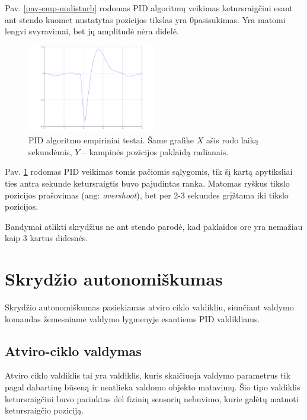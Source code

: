\documentclass[12pt, a4paper, lithuanian, final]{article}
\begin{document}
Pav. \ref{pav-emp-nodisturb} rodomas PID algoritmų veikimas ketursraigčiui esant ant stendo kuomet nustatytas pozicijos tikslas yra 0\degree pasisukimas.
Yra matomi lengvi svyravimai, bet jų amplitudė nėra didelė.

\begin{figure}[H]
\begin{center}
\includegraphics[width=0.5\textwidth]{img/Disturbance.png}
\caption{PID algoritmo empiriniai testai. Šame grafike $X$ ašis rodo laiką sekundėmis, $Y$ -- kampinės pozicijos paklaidą radianais.}
\label{pav-emp-disturb}
\end{center}
\end{figure}

Pav. \ref{pav-emp-disturb} rodomas PID veikimas tomis pačiomis sąlygomis, tik šį kartą apytiksliai ties antra sekunde ketursraigtis buvo pajudintas ranka.
Matomas ryškus tikslo pozicijos prašovimas (ang: \textit{overshoot}), bet per 2-3 sekundes grįžtama iki tikslo pozicijos.


Bandymai atlikti skrydžius ne ant stendo parodė, kad paklaidos ore yra nemažiau kaip 3 kartus didesnės.





\section{Skrydžio autonomiškumas}
\label{skyr-autonomus}

Skrydžio autonomiškumas pasiekiamas atviro ciklo valdikliu, siunčiant valdymo komandas žemesniame valdymo lygmenyje esantiems PID valdikliams.

\subsection{Atviro-ciklo valdymas}

Atviro ciklo valdiklis tai yra valdiklis, kuris skaičiuoja valdymo parametrus tik pagal dabartinę būseną ir neatlieka valdomo objekto matavimų.
Šio tipo valdiklis ketursraigčiui buvo parinktas dėl fizinių sensorių nebuvimo, kurie galėtų matuoti ketursraigčio poziciją.
\end{document}
